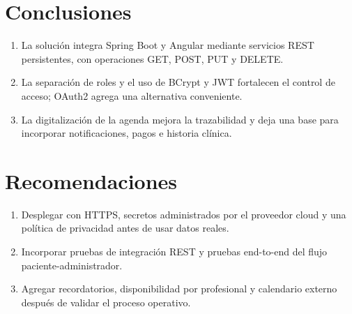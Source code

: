 \documentclass[12pt,a4paper,oneside]{report}
\begin{document}
\section{Conclusiones}
\begin{enumerate}
\item La solución integra Spring Boot y Angular mediante servicios REST persistentes, con operaciones GET, POST, PUT y DELETE.
\item La separación de roles y el uso de BCrypt y JWT fortalecen el control de acceso; OAuth2 agrega una alternativa conveniente.
\item La digitalización de la agenda mejora la trazabilidad y deja una base para incorporar notificaciones, pagos e historia clínica.
\end{enumerate}

\section{Recomendaciones}
\begin{enumerate}
\item Desplegar con HTTPS, secretos administrados por el proveedor cloud y una política de privacidad antes de usar datos reales.
\item Incorporar pruebas de integración REST y pruebas end-to-end del flujo paciente-administrador.
\item Agregar recordatorios, disponibilidad por profesional y calendario externo después de validar el proceso operativo.
\end{enumerate}

\clearpage
\end{document}

